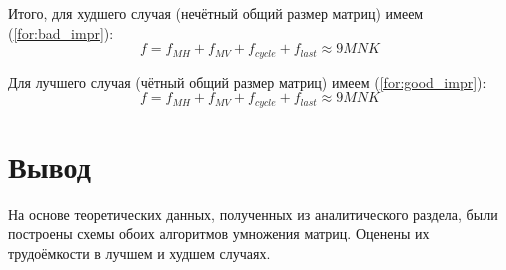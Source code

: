 Итого, для худшего случая (нечётный общий размер матриц) имеем (\ref{for:bad_impr}):
\begin{equation}
	\label{for:bad_impr}
	f = f_{MH} + f_{MV} + f_{cycle} + f_{last} \approx 9MNK
\end{equation}

Для лучшего случая (чётный общий размер матриц) имеем (\ref{for:good_impr}):
\begin{equation}
	\label{for:good_impr}
	f = f_{MH} + f_{MV} + f_{cycle} + f_{last} \approx 9MNK
\end{equation}


\section*{Вывод}

На основе теоретических данных, полученных из аналитического раздела, были построены схемы обоих алгоритмов умножения матриц.  Оценены их трудоёмкости в лучшем и худшем случаях.

\clearpage

\clearpage

\clearpage
